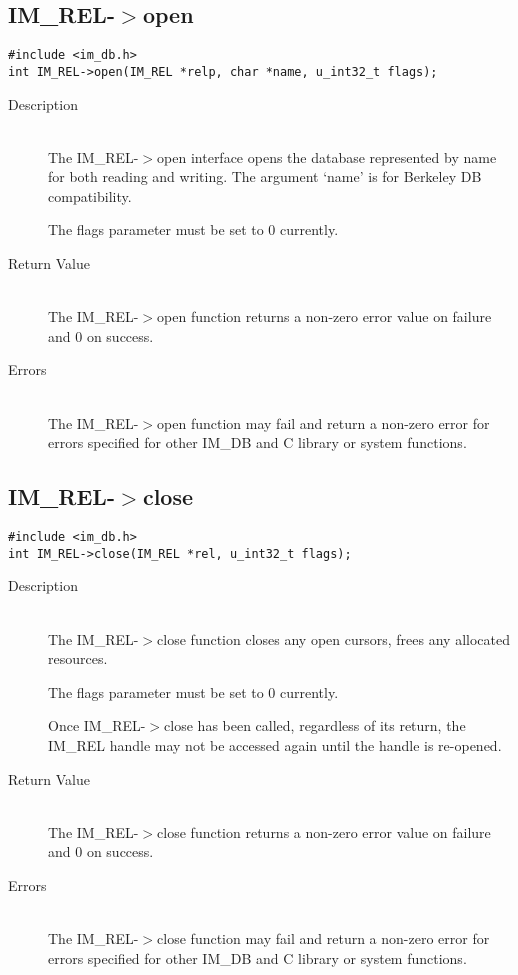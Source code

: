 \documentclass[11pt]{article}
\def\cdf{\sf }
\def\cdf{\sf }
\newcommand{\IMDB}{{\small{\cdf IM\_DB}}}
\newcommand{\IMREL}{{\small{\cdf IM\_REL}}}
\begin{document}
\newpage
\subsection{{\IMREL}-$>$open}
\begin{verbatim}
#include <im_db.h>
int IM_REL->open(IM_REL *relp, char *name, u_int32_t flags);
\end{verbatim}
\begin{description}
\item[Description]\ \\
  The {\IMREL}-$>$open interface opens the database represented by name for
  both reading and writing. The argument `name' is for Berkeley DB
  compatibility.

  The flags parameter must be set to 0 currently.  

\item[Return Value]\ \\
  The {\IMREL}-$>$open function returns a non-zero error value on failure
  and 0 on success.
\item[Errors]\ \\
  The {\IMREL}-$>$open function may fail and return a non-zero
  error for errors specified for other {\IMDB} and C library or
  system functions.
\end{description}

\newpage
\subsection{{\IMREL}-$>$close}
\begin{verbatim}
#include <im_db.h>
int IM_REL->close(IM_REL *rel, u_int32_t flags);
\end{verbatim}
\begin{description}
\item[Description]\ \\
The {\IMREL}-$>$close function closes any open cursors, frees any
allocated resources.

The flags parameter must be set to 0 currently.  

Once {\IMREL}-$>$close has been called, regardless of its return, the
{\IMREL} handle may not be accessed again until the handle is
re-opened.
\item[Return Value]\ \\
The {\IMREL}-$>$close function returns a non-zero error value on failure
and 0 on success.
\item[Errors]\ \\
The {\IMREL}-$>$close function may fail and return a non-zero error for
errors specified for other {\IMDB} and C library or system functions.
\end{description}
\end{document}
